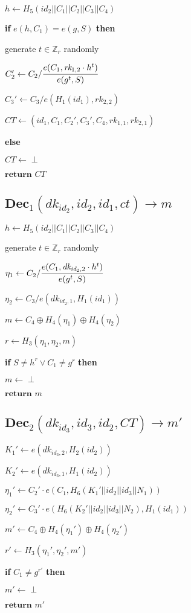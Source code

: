 \documentclass[a4paper]{article}
\begin{document}
$h \gets H_5(\textit{id}_2 || C_1 || C_2 || C_3 || C_4)$

\textbf{if} $e(h, C_1) = e(g, S)$ \textbf{then}

generate $t \in \mathbb{Z}_r$ randomly

$C_2' \gets C_2 / \cfrac{e(C_1, \textit{rk}_{1, 2} \cdot h^t)}{e(g^t, S)}$

$C_3' \gets C_3 / e(H_1(\textit{id}_1), \textit{rk}_{2, 2})$

$\textit{CT} \gets (\textit{id}_1, C_1, C_2', C_3', C_4, \textit{rk}_{1, 1}, \textit{rk}_{2, 1})$

\textbf{else}

\quad$\textit{CT} \gets \perp$

$\textbf{return }\textit{CT}$

\subsection{$\textbf{Dec}_1(\textit{dk}_{\textit{id}_2}, \textit{id}_2, \textit{id}_1, \textit{ct}) \rightarrow m$}

$h \gets H_5(\textit{id}_2 || C_1 || C_2 || C_3 || C_4)$

generate $t \in \mathbb{Z}_r$ randomly

$\eta_1 \gets C_2 / \cfrac{e(C_1, \textit{dk}_{\textit{id}_2, 2} \cdot h^t)}{e(g^t, S)}$

$\eta_2 \gets C_3 / e(\textit{dk}_{\textit{id}_2, 1}, H_1(\textit{id}_1))$

$m \gets C_4 \oplus H_4(\eta_1) \oplus H_4(\eta_2)$

$r \gets H_3(\eta_1, \eta_2, m)$

\textbf{if }$S \neq h^r \lor C_1 \neq g^r$\textbf{ then}

\quad$m \gets \perp$

$\textbf{return }m$

\subsection{$\textbf{Dec}_2(\textit{dk}_{\textit{id}_3}, \textit{id}_3, \textit{id}_2, \textit{CT}) \rightarrow m'$}

$K_1' \gets e(\textit{dk}_{\textit{id}_3, 2}, H_2(\textit{id}_2))$

$K_2' \gets e(\textit{dk}_{\textit{id}_3, 1}, H_1(\textit{id}_2))$

$\eta_1' \gets C_2' \cdot e(C_1, H_6(K_1' || \textit{id}_2 || \textit{id}_3 || N_1))$

$\eta_2' \gets C_3' \cdot e(H_6(K_2' || \textit{id}_2 || \textit{id}_3 || N_2), H_1(\textit{id}_1))$

$m' \gets C_4 \oplus H_4(\eta_1') \oplus H_4(\eta_2')$

$r' \gets H_3(\eta_1', \eta_2', m')$

\textbf{if }$C_1 \neq g^{r'}$\textbf{ then}

\quad$m' \gets \perp$

$\textbf{return }m'$
\end{document}
